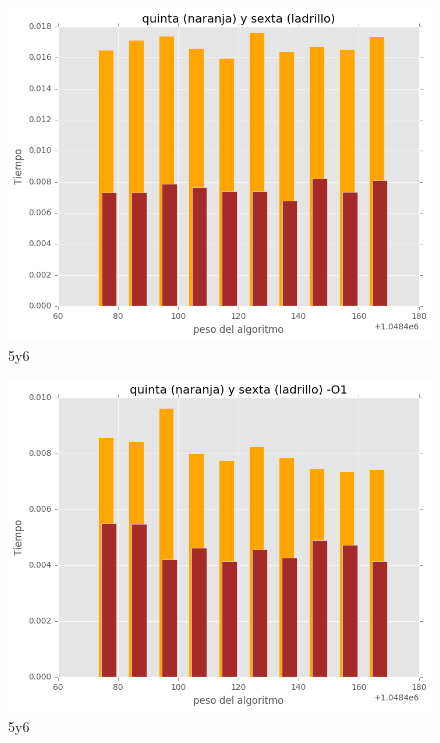 \documentclass[a4paper, 11pt]{article}
\begin{document}
\begin{figure}[!hbp]
	\includegraphics[scale=0.6]{5y6p.png}
	\caption{5y6	\label{5y6p}}
\end{figure} 
\begin{figure}[!hbp]
	\includegraphics[scale=0.6]{5y6p_1.png}
	\caption{5y6	\label{5y6p_1}}
\end{figure} 
\end{document}

